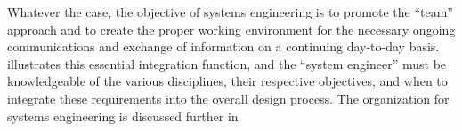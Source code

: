 Whatever the case, the objective of systems engineering is to promote the “team” approach and to create the proper working environment for the necessary ongoing communications and exchange of information on a continuing day-to-day basis. illustrates this essential integration function, and the “system engineer” must be knowledgeable of the various disciplines, their respective objectives, and when to integrate these requirements into the overall design process. The organization for systems engineering is discussed further in
